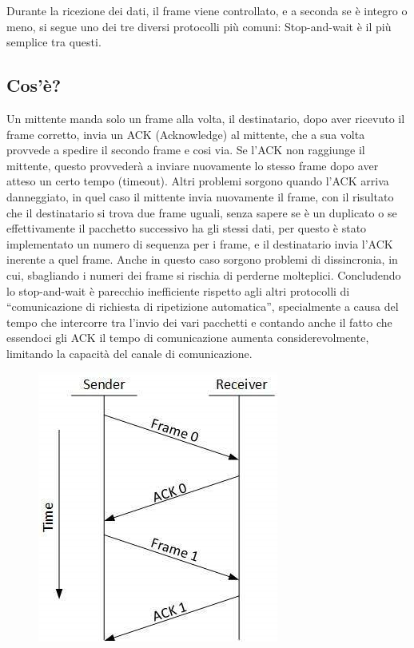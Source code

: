 Durante la ricezione dei dati, il frame viene controllato, e a seconda se è integro o meno, si segue uno dei tre diversi protocolli più comuni: 
Stop-and-wait è il più semplice tra questi.
\subsection{Cos'è?}
Un mittente manda solo un frame alla volta, il destinatario, dopo aver ricevuto il frame corretto, invia un ACK (Acknowledge) al mittente, che a sua volta provvede a spedire il secondo frame e cosi via. 
Se l'ACK non raggiunge il mittente, questo provvederà a inviare nuovamente lo stesso frame dopo aver atteso un certo tempo (timeout).
Altri problemi sorgono quando l'ACK arriva danneggiato, in quel caso il mittente invia nuovamente il frame, con il risultato che il destinatario si trova due frame uguali, senza sapere se è un duplicato o se effettivamente il pacchetto successivo ha gli stessi dati, per questo è stato implementato un numero di sequenza per i frame, e il destinatario invia l'ACK inerente a quel frame.
Anche in questo caso sorgono problemi di dissincronia, in cui, sbagliando i numeri dei frame si rischia di perderne molteplici.
Concludendo lo stop-and-wait è parecchio inefficiente rispetto agli altri protocolli di “comunicazione di richiesta di ripetizione automatica”, specialmente a causa del tempo che intercorre tra l'invio dei vari pacchetti e contando anche il fatto che essendoci gli ACK il tempo di comunicazione aumenta considerevolmente, limitando la capacità del canale di comunicazione.
 
\begin{figure}[H]
\centering
\includegraphics[scale=0.65]{res/img/17_StopAndWait.png}
\end{figure}

